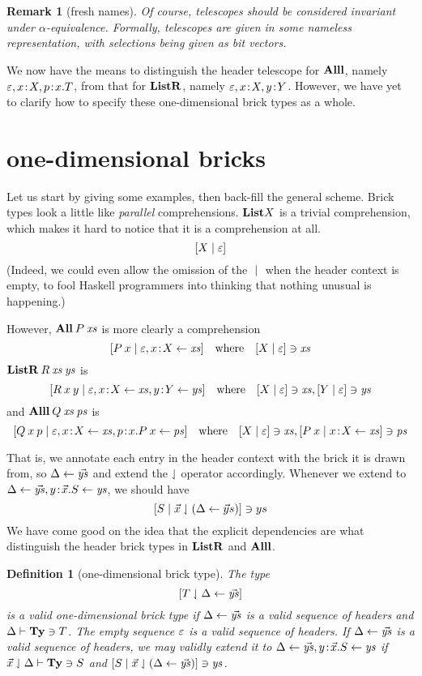 \documentclass{article}
\newtheorem{defn}[thm]{Definition}
\newtheorem{rem}{Remark}[thm]
\begin{document}
\begin{rem}[fresh names]
  Of course, telescopes should be considered invariant under $\alpha$-equivalence. Formally, telescopes are given in some nameless representation, with selections being given as bit vectors.
\end{rem}

We now have the means to distinguish the header telescope for $\mathbf{Alll}$, namely $\varepsilon,x\!:\! X,p\!:\! x.T$, from that for $\mathbf{ListR}$, namely $\varepsilon,x\!:\! X, y\!:\! Y$. However, we have yet to clarify how to specify these one-dimensional brick types as a whole.


\section{one-dimensional bricks}

Let us start by giving some examples, then back-fill the general scheme. Brick types look a little like \emph{parallel} comprehensions. $\mathbf{List} X$ is a trivial comprehension, which makes it hard to notice that it is a comprehension at all.
\[
  [X\;|\;\varepsilon]
\]
(Indeed, we could even allow the omission of the $\;|\;$ when the header context is empty, to fool Haskell programmers into thinking that nothing unusual is happening.)
  
However, $\mathbf{All}\:P\:\mathit{xs}$ is more clearly a comprehension
\[
  [P\:x\;|\; \varepsilon, x\!:\! X\leftarrow\mathit{xs}]
  \quad\mbox{where}\quad
  [X\;|\;\varepsilon]\ni \mathit{xs}
\]
$\mathbf{ListR}\:R\:\mathit{xs}\:\mathit{ys}$ is
\[
  [R\:x\:y\;|\; \varepsilon, x\!:\! X\leftarrow\mathit{xs}, y\!:\! Y\leftarrow\mathit{ys}]
  \quad\mbox{where}\quad
  [X\;|\;\varepsilon]\ni \mathit{xs}, [Y\;|\;\varepsilon]\ni \mathit{ys}
\]
and $\mathbf{Alll}\:Q\:\mathit{xs}\:\mathit{ps}$ is
\[
  [Q\:x\:p\;|\; \varepsilon, x\!:\! X\leftarrow\mathit{xs}, p\!:\! x.P\:x\leftarrow\mathit{ps}]
  \quad\mbox{where}\quad
  [X\;|\;\varepsilon]\ni \mathit{xs}, [P\:x\;|\; x\!:\! X\leftarrow\mathit{xs}]\ni \mathit{ps}
\]

That is, we annotate each entry in the header context with the brick it is drawn from, so $\Delta\leftarrow\vec{\mathit{ys}}$ and extend the $\downharpoonleft$ operator accordingly. Whenever we extend to $\Delta\leftarrow\vec{\mathit{ys}},y\!:\!\vec x.S\leftarrow \mathit{ys}$, we should have
\[
  [S\;|\; \vec x\downharpoonleft(\Delta\leftarrow\vec ys)]\ni ys
\]
We have come good on the idea that the explicit dependencies are what distinguish the header brick types in $\mathbf{ListR}$ and $\mathbf{Alll}$.

\begin{defn}[one-dimensional brick type]
  The type
  \[
    [T\downharpoonleft\Delta\leftarrow\vec{\mathit{ys}}]
  \]
  is a valid one-dimensional brick type if $\Delta\leftarrow\vec{\mathit{ys}}$ is a valid sequence of headers and $\Delta\vdash\mathbf{Ty}\ni T$.
  The empty sequence $\varepsilon$ is a valid sequence of headers. If $\Delta\leftarrow\vec{\mathit{ys}}$ is a valid sequence of headers, we may validly extend it to $\Delta\leftarrow\vec{\mathit{ys}},y\!:\!\vec x.S\leftarrow \mathit{ys}$ if $\vec x\downharpoonleft\Delta\vdash \mathbf{Ty}\ni S$ and $[S\;|\;\vec x\downharpoonleft(\Delta\leftarrow\vec{\mathit{ys}})]\ni\mathit{ys}$.
\end{defn}
\end{document}
